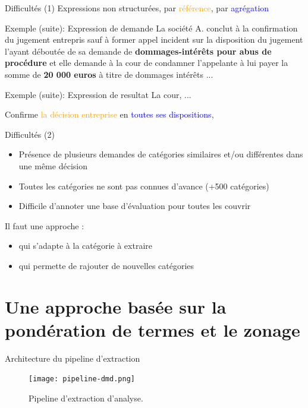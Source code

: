 \documentclass[newPxFont,pagenumber]{beamer}
\begin{document}
\begin{frame}{Difficultés (1)}
Expressions non structurées, par  \textcolor{orange}{référence}, par \textcolor{blue}{agrégation}

\begin{exampleblock}{Exemple (suite): Expression de demande} %
La société A. conclut à la confirmation du jugement entrepris sauf à
former appel incident sur la disposition du jugement l'ayant déboutée de sa
demande de \textbf{dommages-intérêts pour abus de procédure} et elle demande à la cour de
condamner l'appelante à lui payer la somme de \textbf{20 000 euros} à titre de dommages
intérêts ...

\end{exampleblock}

\begin{exampleblock}{Exemple (suite): Expression de resultat}
La cour, ... 

Confirme \textcolor{orange}{la décision entreprise} en \textcolor{blue}{toutes ses dispositions},
\end{exampleblock}
\end{frame}

\begin{frame}{Difficultés (2)}
\begin{alertblock}{}
\begin{itemize}
\item Présence de plusieurs demandes de catégories similaires et/ou différentes dans une m\^eme décision
\item Toutes les catégories ne sont pas connues d'avance (+500 catégories)
\item Difficile d'annoter une base d'évaluation pour toutes les couvrir
\end{itemize}
\end{alertblock}

\begin{block}{Il faut une approche :}
\begin{itemize}
\item qui s'adapte à la catégorie à extraire 
\item qui permette de rajouter de nouvelles catégories 
\end{itemize}
\end{block}
\end{frame}
\section{Une approche basée sur la pondération de termes et le zonage}
\begin{frame}{Architecture du pipeline d'extraction}
\begin{figure}
\texttt{[image: pipeline-dmd.png]}
\caption{Pipeline d'extraction d'analyse.}
\end{figure}
\end{frame}
\end{document}
